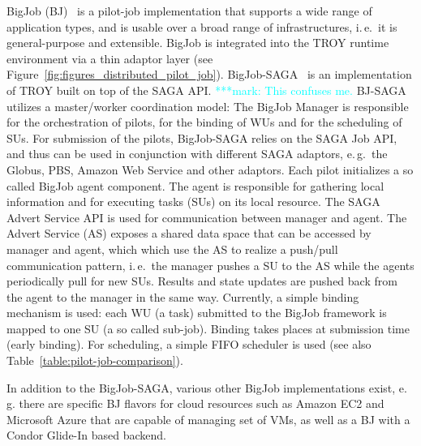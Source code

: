\documentclass[conference,final]{IEEEtran}
\newcommand{\msnote}[1]{ {\textcolor{cyan} { ***mark: #1 }}}
\newcommand{\msnote}[1]{}
\begin{document}


BigJob (BJ)~\cite{bigjob_web} is a pilot-job implementation that supports a wide
range of application types, and is usable over a broad range of infrastructures,
i.\,e.\ it is general-purpose and extensible. BigJob is integrated into the TROY
runtime environment via a thin adaptor layer (see
Figure~\ref{fig:figures_distributed_pilot_job}).
BigJob-SAGA~\cite{saga_bigjob_condor_cloud} is an implementation of TROY built on
top of the SAGA API. \msnote{This confuses me.}
BJ-SAGA utilizes a master/worker coordination model: The
BigJob Manager is responsible for the orchestration of pilots, for the binding 
of WUs and for the scheduling of SUs. For submission of the pilots, BigJob-SAGA
relies on the SAGA Job API, and thus can be used in conjunction with different
SAGA adaptors, e.\,g.\ the Globus, PBS, Amazon Web Service and other adaptors.
Each pilot initializes a so called BigJob agent component. The agent is
responsible for gathering local information and for executing tasks (SUs) on its
local resource. The SAGA Advert Service API is used for communication
between manager and agent. The Advert Service (AS) exposes a shared data space that
can be accessed by manager and agent, which which use the AS to
realize a push/pull communication
pattern, i.\,e.\ the manager pushes a SU to the AS while the agents
periodically pull for new SUs. Results and state updates are pushed back from
the agent to the manager in the same way. Currently, a simple binding mechanism
is used: each WU (a task) submitted to the BigJob framework is mapped to one SU
(a so called sub-job). Binding takes places at submission time (early binding). For
scheduling, a simple FIFO scheduler is used (see also
Table~\ref{table:pilot-job-comparison}).

In addition to the BigJob-SAGA, various other BigJob
implementations exist, e.\,g. there are specific BJ flavors for cloud
resources such as Amazon EC2 and Microsoft Azure that are capable of
managing set of VMs, as well as a BJ with a Condor Glide-In based
backend. 

\end{document}
